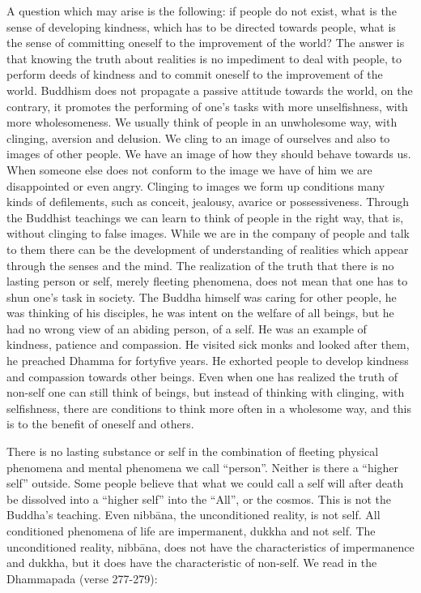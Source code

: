 \documentclass{book}
\begin{document}
A question which may arise is the following: if people do not exist,
what is the sense of developing kindness, which has to be directed
towards people, what is the sense of committing oneself to the
improvement of the world? The answer is that knowing the truth about
realities is no impediment to deal with people, to perform deeds of
kindness and to commit oneself to the improvement of the world. Buddhism
does not propagate a passive attitude towards the world, on the
contrary, it promotes the performing of one's tasks with more
unselfishness, with more wholesomeness. We usually think of people in an
unwholesome way, with clinging, aversion and delusion. We cling to an
image of ourselves and also to images of other people. We have an image
of how they should behave towards us. When someone else does not conform
to the image we have of him we are disappointed or even angry. Clinging
to images we form up conditions many kinds of defilements, such as
conceit, jealousy, avarice or possessiveness. Through the Buddhist
teachings we can learn to think of people in the right way, that is,
without clinging to false images. While we are in the company of people
and talk to them there can be the development of understanding of
realities which appear through the senses and the mind. The realization
of the truth that there is no lasting person or self, merely fleeting
phe­nomena, does not mean that one has to shun one's task in society.
The Buddha himself was caring for other people, he was thinking of his
disciples, he was intent on the welfare of all beings, but he had no
wrong view of an abiding person, of a self. He was an example of
kindness, patience and compassion. He visited sick monks and looked
after them, he preached Dhamma for fortyfive years. He exhorted people
to develop kindness and compassion towards other beings. Even when one
has realized the truth of non-self one can still think of beings, but
instead of thinking with clinging, with selfishness, there are
conditions to think more often in a wholesome way, and this is to the
benefit of oneself and others.

There is no lasting substance or self in the combination of fleeting
physical phenomena and mental phenomena we call ``person''. Neither is
there a ``higher self'' outside. Some people believe that what we could
call a self will after death be dissolved into a ``higher self'' into
the ``All'', or the cosmos. This is not the Buddha's teaching. Even
nibbāna, the unconditioned reality, is not self. All conditioned
phe­nomena of life are impermanent, dukkha and not self. The
unconditioned reality, nibbāna, does not have the characteristics of
impermanence and dukkha, but it does have the characteristic of
non-self. We read in the Dhammapada (verse 277-279):
\end{document}
